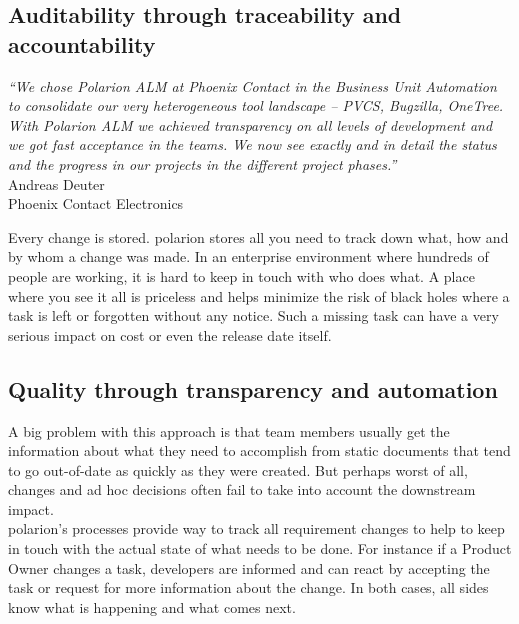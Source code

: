 \documentclass[thesis=M,english]{FITthesis}[2012/06/26]
\begin{document}
\subsection{Auditability through traceability and accountability}

\begin{center}
	\textit{“We chose Polarion ALM at Phoenix Contact
		in the Business Unit Automation to consolidate
		our very heterogeneous tool
		landscape – PVCS, Bugzilla, OneTree. With
		Polarion ALM we achieved transparency on
		all levels of development and we got fast
		acceptance in the teams. We now see exactly
		and in detail the status and the progress in
		our projects in the different project phases.”}\\
	Andreas Deuter\\
	Phoenix Contact Electronics\\
\end{center}

Every change is stored. \acrshort{polarion} stores all you need to track down what, how and by whom a change was made. In an enterprise environment where hundreds of people are working, it is hard to keep in touch with who does what. A place where you see it all is priceless and helps minimize the risk of black holes where a task is left or forgotten without any notice. Such a missing task can have a very serious impact on cost or even the release date itself.  

\subsection{Quality through transparency and automation}

A big problem with this approach is that team members usually get the information about what they need to accomplish from static documents that tend to go out-of-date as quickly as they were created. But perhaps worst of all, changes and ad hoc decisions often fail to take into account the downstream impact.\\

\acrshort{polarion}'s processes provide way to track all requirement changes to help to keep in touch with the actual state of what needs to be done. For instance if a Product Owner changes a task, developers are informed and can react by accepting the task or request for more information about the change. In both cases, all sides know what is happening and what comes next.\\
\end{document}
